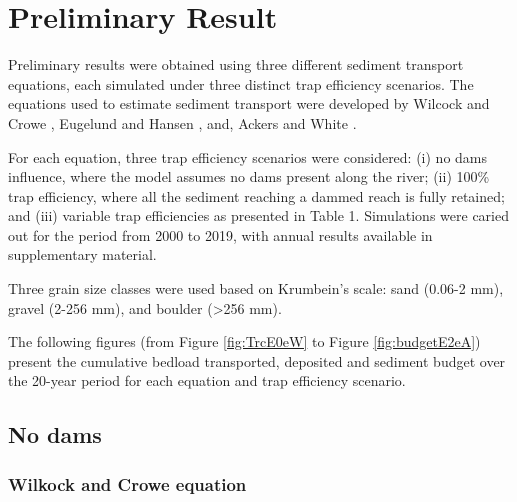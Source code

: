 \documentclass[
]{book}
\begin{document}
\chapter{Preliminary Result}\label{preliminary-result}

Preliminary results were obtained using three different sediment transport equations, each simulated under three distinct trap efficiency scenarios. The equations used to estimate sediment transport were developed by Wilcock and Crowe \citeyearpar{WandC2003}, Eugelund and Hansen \citeyearpar{EandH67}, and, Ackers and White \citeyearpar{AandW73}.

For each equation, three trap efficiency scenarios were considered: (i) no dams influence, where the model assumes no dams present along the river; (ii) 100\% trap efficiency, where all the sediment reaching a dammed reach is fully retained; and (iii) variable trap efficiencies as presented in Table 1. Simulations were caried out for the period from 2000 to 2019, with annual results available in supplementary material.

Three grain size classes were used based on Krumbein's scale: sand (0.06-2 mm), gravel (2-256 mm), and boulder (\textgreater256 mm).

The following figures (from Figure \ref{fig:TrcE0eW} to Figure \ref{fig:budgetE2eA}) present the cumulative bedload transported, deposited and sediment budget over the 20-year period for each equation and trap efficiency scenario.

\section{No dams}\label{no-dams}

\subsection{Wilkock and Crowe equation}\label{wilkock-and-crowe-equation}
\end{document}
